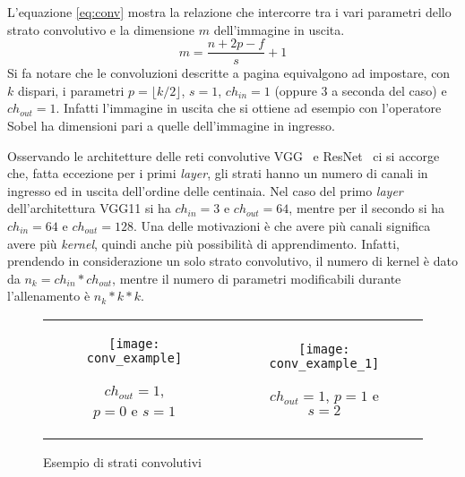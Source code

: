 L'equazione \ref{eq:conv} mostra la relazione che intercorre tra i vari parametri dello strato convolutivo e la dimensione $m$ dell'immagine in uscita.
\begin{equation} \label{eq:conv}
  m = \frac
  {n + 2p - f}
  {s} 
  + 1
\end{equation}
Si fa notare che le convoluzioni descritte a pagina \pageref{conv_para} equivalgono ad impostare, con $k$ dispari, i parametri $p=\lfloor k/2 \rfloor$, $s=1$, $ch_{in}=1$ (oppure 3 a seconda del caso) e $ch_{out}=1$.
Infatti l'immagine in uscita che si ottiene ad esempio con l'operatore Sobel ha dimensioni pari a quelle dell'immagine in ingresso.

Osservando le architetture delle reti convolutive VGG~\cite{vgg} e ResNet~\cite{resnet} ci si accorge che, fatta eccezione per i primi \textit{layer}, gli strati hanno un numero di canali in ingresso ed in uscita dell'ordine delle centinaia.
Nel caso del primo \textit{layer} dell'architettura VGG11 si ha $ch_{in} = 3$ e $ch_{out} = 64$, mentre per il secondo si ha $ch_{in} = 64$ e $ch_{out} = 128$.
Una delle motivazioni è che avere più canali significa avere più \textit{kernel}, quindi anche più possibilità di apprendimento.
Infatti, prendendo in considerazione un solo strato convolutivo, il numero di kernel è dato da $n_k = ch_{in}*ch_{out}$, mentre il numero di parametri modificabili durante l'allenamento è $n_k * k * k$.

\begin{figure}[ht]
  \begin{center}
  \begin{tabular}{cc}
    \begin{subfigure}{.49\linewidth}
      \centering\texttt{[image: conv\_example]}
      \caption{$ch_{out}=1$, $p=0$ e $s=1$}
      \label{fig:conv_layer_1ch}
    \end{subfigure} &

    \begin{subfigure}{.49\linewidth}
      \centering\texttt{[image: conv\_example\_1]}
      \caption{$ch_{out}=1$, $p=1$ e $s=2$}
      \label{fig:conv_layer_1ch_p1_s2}
    \end{subfigure}


  \end{tabular}
  \caption{Esempio di strati convolutivi}
  \label{fig:conv_layer}
  \end{center}
\end{figure}


